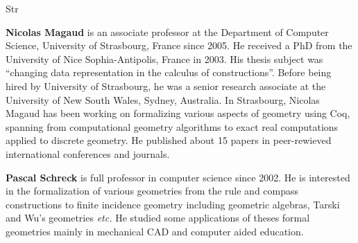 \begin{sitedescription}{Str}
\begin{compactitem}
\item{\bf Nicolas Magaud} is an associate professor at the Department of
Computer Science, University of Strasbourg, France since 2005. He
received a PhD from the University of Nice Sophia-Antipolis, France in
2003. His thesis subject was ``changing data representation in the
calculus of constructions''. Before being hired by University of
Strasbourg, he was a senior research associate at the University of
New South Wales, Sydney, Australia. In Strasbourg, Nicolas Magaud
has been working on formalizing various aspects of geometry using Coq, spanning from
computational geometry algorithms to exact real computations applied to
discrete geometry. He published about 15 papers in peer-rewieved
international conferences and journals.  

\item{\bf Pascal Schreck} is full professor in computer science since 2002. He is interested in the formalization of various geometries from the rule and compass constructions to finite incidence geometry including geometric algebras, Tarski and Wu's geometries \emph{etc.} He studied some applications of theses formal geometries mainly in mechanical CAD and computer aided education.
\end{compactitem}

\end{sitedescription}

